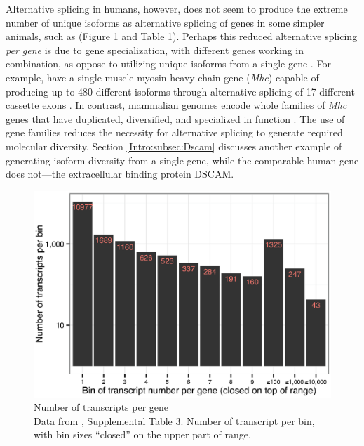     Alternative splicing in humans, however, does not seem to produce the extreme number of unique isoforms as alternative splicing of genes in some simpler animals, such as \flies{} (Figure \ref{Intro:fig:txPerFlyGene} and Table \ref{Intro:fig:txPerFlyGene}). Perhaps this reduced alternative splicing \textit{per gene} is due to gene specialization, with different genes working in combination, as oppose to utilizing unique isoforms from a single gene \citep{Park2007}. For example, \flies{} have a single muscle myosin heavy chain gene (\textit{Mhc}) capable of producing up to 480 different isoforms through alternative splicing of 17 different cassette exons \citep{Bernstein1983a}. In contrast, mammalian genomes encode whole families of \textit{Mhc} genes that have duplicated, diversified, and specialized in function \citep{Weiss1996}. The use of gene families reduces the necessity for alternative splicing to generate required molecular diversity. Section \ref{Intro:subsec:Dscam} discusses another example of \flies{} generating isoform diversity from a single gene, while the comparable human gene does not---the extracellular binding protein DSCAM.

    \begin{figure} %
      \centering 
      \includegraphics{Figures/Intro/NumberOFTranscriptsPerFlyGene.eps}
      \caption[Number of transcripts per \flies{} gene]
      {
        Number of transcripts per \flies{} gene\\[0.25cm]
        Data from \citep{Brown2014}, Supplemental Table 3. Number of transcript per bin, with bin sizes ``closed'' on the upper part of range.
        }
      \label{Intro:fig:txPerFlyGene}
      \end{figure}

